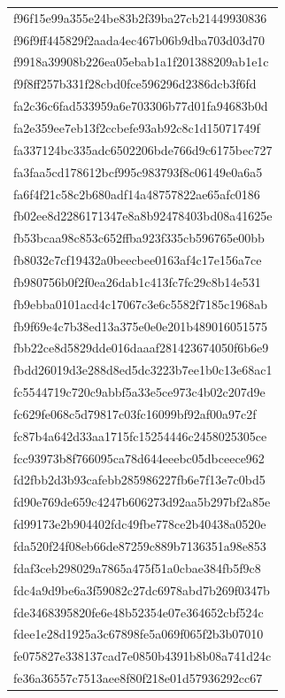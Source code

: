 \begin{tabular}{l}
f96f15e99a355e24be83b2f39ba27cb21449930836 \\
f96f9ff445829f2aada4ec467b06b9dba703d03d70 \\
f9918a39908b226ea05ebab1a1f201388209ab1e1c \\
f9f8ff257b331f28cbd0fce596296d2386dcb3f6fd \\
fa2c36c6fad533959a6e703306b77d01fa94683b0d \\
fa2e359ee7eb13f2ccbefe93ab92c8c1d15071749f \\
fa337124bc335adc6502206bde766d9c6175bec727 \\
fa3faa5cd178612bcf995c983793f8c06149e0a6a5 \\
fa6f4f21c58c2b680adf14a48757822ae65afc0186 \\
fb02ee8d2286171347e8a8b92478403bd08a41625e \\
fb53bcaa98c853c652ffba923f335cb596765e00bb \\
fb8032c7cf19432a0beecbee0163af4c17e156a7ce \\
fb980756b0f2f0ea26dab1c413fc7fc29c8b14e531 \\
fb9ebba0101acd4c17067c3e6c5582f7185c1968ab \\
fb9f69e4c7b38ed13a375e0e0e201b489016051575 \\
fbb22ce8d5829dde016daaaf281423674050f6b6e9 \\
fbdd26019d3e288d8ed5dc3223b7ee1b0c13e68ac1 \\
fc5544719c720c9abbf5a33e5ce973c4b02c207d9e \\
fc629fe068c5d79817c03fc16099bf92af00a97c2f \\
fc87b4a642d33aa1715fc15254446c2458025305ce \\
fcc93973b8f766095ca78d644eeebc05dbceece962 \\
fd2fbb2d3b93cafebb285986227fb6e7f13e7c0bd5 \\
fd90e769de659c4247b606273d92aa5b297bf2a85e \\
fd99173e2b904402fdc49fbe778ce2b40438a0520e \\
fda520f24f08eb66de87259c889b7136351a98e853 \\
fdaf3ceb298029a7865a475f51a0cbae384fb5f9c8 \\
fdc4a9d9be6a3f59082c27dc6978abd7b269f0347b \\
fde3468395820fe6e48b52354e07e364652cbf524c \\
fdee1e28d1925a3c67898fe5a069f065f2b3b07010 \\
fe075827e338137cad7e0850b4391b8b08a741d24c \\
fe36a36557c7513aee8f80f218e01d57936292cc67 \\

\end{tabular}
